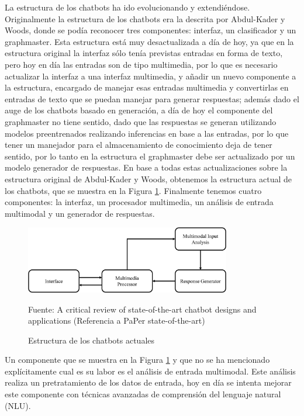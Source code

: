 La estructura de los chatbots ha ido evolucionando y extendiéndose. Originalmente la estructura de los chatbots era la descrita por Abdul-Kader y Woods, donde se podía reconocer tres componentes: interfaz, un clasificador y un graphmaster. Esta estructura está muy desactualizada a día de hoy, ya que en la estructura original la interfaz sólo tenía previstas entradas en forma de texto, pero hoy en día las entradas son de tipo multimedia, por lo que es necesario actualizar la interfaz a una interfaz multimedia, y añadir un nuevo componente a la estructura, encargado de manejar esas entradas multimedia y convertirlas en entradas de texto que se puedan manejar para generar respuestas; además dado el auge de los chatbots basado en generación, a día de hoy el componente del graphmaster no tiene sentido, dado que las respuestas se generan utilizando modelos preentrenados realizando inferencias en base a las entradas, por lo que tener un manejador para el almacenamiento de conocimiento deja de tener sentido, por lo tanto en la estructura el graphmaster debe ser actualizado por un modelo generador de respuestas. En base a todas estas actualizaciones sobre la estructura original de Abdul-Kader y Woods, obtenemos la estructura actual de los chatbots, que se muestra en la Figura \ref{fig:estructura_state_of_art}. Finalmente tenemos cuatro componentes: la interfaz, un procesador multimedia, un análisis de entrada multimodal y un generador de respuestas.

\begin{figure}[h]
    \centering
    \includegraphics[width=0.8\textwidth]{imagenes/01_Introduccion/estructura_state_of_art.jpg}
    \begin{center}
        Fuente: A critical review of state-of-the-art chatbot designs and applications (Referencia a PaPer state-of-the-art)
    \end{center}
    \caption{Estructura de los chatbots actuales}
    \label{fig:estructura_state_of_art}
\end{figure}

Un componente que se muestra en la Figura \ref{fig:estructura_state_of_art} y que no se ha mencionado explícitamente cual es su labor es el análisis de entrada multimodal. Este análisis realiza un pretratamiento de los datos de entrada, hoy en día se intenta mejorar este componente con técnicas avanzadas de comprensión del lenguaje natural (NLU).

